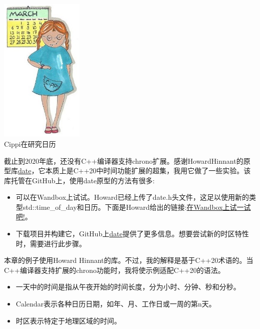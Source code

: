 \begin{center}
\includegraphics[width=0.3\textwidth]{content/3/chapter5/images/18.png}\\
Cippi在研究日历
\end{center}

\begin{tcolorbox}[breakable,enhanced jigsaw,colback=blue!5!white,colframe=blue!75!black,title={缺少编译器支持}]
	
截止到2020年底，还没有C++编译器支持chrono扩展。感谢HowardHinnant的原型库\href{https://github.com/HowardHinnant/date}{date}，它本质上是C++20中时间功能扩展的超集，我用它做了一些实验。该库托管在GitHub上，使用date原型的方法有很多:

\begin{itemize}
\item 
可以在Wandbox上试试。Howard已经上传了date.h头文件，这足以使用新的类型std::time\_of\_day和日历。下面是Howard给出的链接:\href{https://wandbox.org/permlink/L8MwjzSSC3fXXrMd}{在Wandbox上试一试吧!}。

\item 
下载项目并构建它，GitHub上\href{https://github.com/HowardHinnant/date}{date}提供了更多信息。想要尝试新的时区特性时，需要进行此步骤。
\end{itemize}

本章的例子使用Howard Hinnant的库。不过，我的解释是基于C++20术语的。当C++编译器支持扩展的chrono功能时，我将使示例适配C++20的语法。
\end{tcolorbox}

\begin{itemize}
\item 
一天中的时间是指从午夜开始的时间长度，分为小时、分钟、秒和分秒。

\item 
Calendar表示各种日历日期，如年、月、工作日或一周的第n天。

\item 
时区表示特定于地理区域的时间。
\end{itemize}

